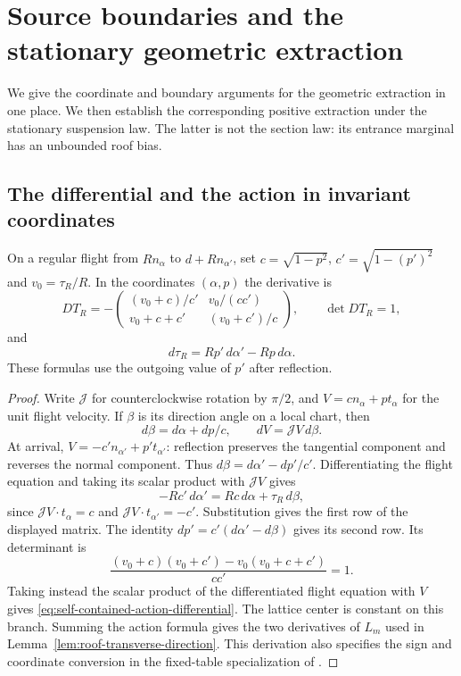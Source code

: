 \section{Source boundaries and the stationary geometric extraction}
\label{sec:source-boundary-calculus}
We give the coordinate and boundary arguments for the geometric
extraction in one place. We then establish the corresponding positive
extraction under the stationary suspension law. The latter is not the
section law: its entrance marginal has an unbounded roof bias.

\subsection{The differential and the action in invariant coordinates}
\begin{lemma}
\label{lem:self-contained-collision-differential}
On a regular flight from $Rn_\alpha$ to $d+Rn_{\alpha'}$, set
$c=\sqrt{1-p^2}$, $c'=\sqrt{1-(p')^2}$ and $v_0=\tau_R/R$.
In the coordinates $(\alpha,p)$ the derivative is
\[
 DT_R=-\begin{pmatrix}
 (v_0+c)/c'&v_0/(cc')\\
 v_0+c+c'&(v_0+c')/c
 \end{pmatrix},\qquad \det DT_R=1,
\]
and
\begin{equation}\label{eq:self-contained-action-differential}
 d\tau_R=Rp'\,d\alpha'-Rp\,d\alpha.
\end{equation}
These formulas use the outgoing value of $p'$ after reflection.
\end{lemma}
\begin{proof}
Write $\mathcal J$ for counterclockwise rotation by $\pi/2$, and
$V=cn_\alpha+pt_\alpha$ for the unit flight velocity. If $\beta$ is
its direction angle on a local chart, then
\[
 d\beta=d\alpha+dp/c,\qquad dV=\mathcal JV\,d\beta.
\]
At arrival, $V=-c'n_{\alpha'}+p't_{\alpha'}$: reflection preserves
the tangential component and reverses the normal component. Thus
$d\beta=d\alpha'-dp'/c'$. Differentiating the flight equation and
taking its scalar product with $\mathcal JV$ gives
\[
 -Rc'\,d\alpha'=Rc\,d\alpha+\tau_R\,d\beta,
\]
since $\mathcal JV\cdot t_\alpha=c$ and
$\mathcal JV\cdot t_{\alpha'}=-c'$. Substitution gives the first
row of the displayed matrix. The identity
$dp'=c'(d\alpha'-d\beta)$ gives its second row. Its determinant is
\[
 \frac{(v_0+c)(v_0+c')-v_0(v_0+c+c')}{cc'}=1.
\]
Taking instead the scalar product of the differentiated flight equation
with $V$ gives \eqref{eq:self-contained-action-differential}.
The lattice center is constant on this branch. Summing the action
formula gives the two derivatives of $L_m$ used in
Lemma~\ref{lem:roof-transverse-direction}. This derivation also
specifies the sign and coordinate conversion in the fixed-table
specialization of \cite[Section 3.1]{SYZ}.
\end{proof}

